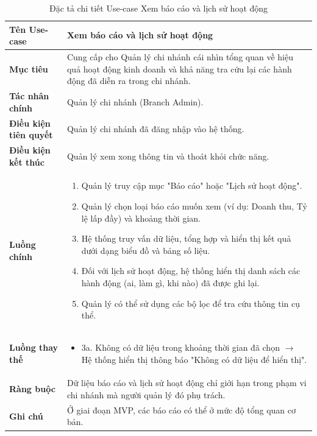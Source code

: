 \begin{table}[H]
\centering
\renewcommand{\arraystretch}{1.3}
\begin{tabular}{|p{4cm}|p{10cm}|}
\hline
\textbf{Tên Use-case} 
& Xem báo cáo và lịch sử hoạt động \\ 
\hline

\textbf{Mục tiêu} 
& Cung cấp cho Quản lý chi nhánh cái nhìn tổng quan về hiệu quả hoạt động kinh doanh và khả năng tra cứu lại các hành động đã diễn ra trong chi nhánh. \\ 
\hline

\textbf{Tác nhân chính} 
& Quản lý chi nhánh (Branch Admin). \\ 
\hline

\textbf{Điều kiện tiên quyết} 
& Quản lý chi nhánh đã đăng nhập vào hệ thống. \\ 
\hline

\textbf{Điều kiện kết thúc} 
& Quản lý xem xong thông tin và thoát khỏi chức năng. \\ 
\hline

\textbf{Luồng chính} 
& 
\begin{enumerate}
    \item Quản lý truy cập mục "Báo cáo" hoặc "Lịch sử hoạt động".
    \item Quản lý chọn loại báo cáo muốn xem (ví dụ: Doanh thu, Tỷ lệ lấp đầy) và khoảng thời gian.
    \item Hệ thống truy vấn dữ liệu, tổng hợp và hiển thị kết quả dưới dạng biểu đồ và bảng số liệu.
    \item Đối với lịch sử hoạt động, hệ thống hiển thị danh sách các hành động (ai, làm gì, khi nào) đã được ghi lại.
    \item Quản lý có thể sử dụng các bộ lọc để tra cứu thông tin cụ thể.
\end{enumerate} \\ 
\hline

\textbf{Luồng thay thế} 
& 
\begin{itemize}
    \item 3a. Không có dữ liệu trong khoảng thời gian đã chọn $\rightarrow$ Hệ thống hiển thị thông báo "Không có dữ liệu để hiển thị".
\end{itemize} \\ 
\hline

\textbf{Ràng buộc} 
& Dữ liệu báo cáo và lịch sử hoạt động chỉ giới hạn trong phạm vi chi nhánh mà người quản lý đó phụ trách. \\ 
\hline

\textbf{Ghi chú} 
& Ở giai đoạn MVP, các báo cáo có thể ở mức độ tổng quan cơ bản. \\ 
\hline
\end{tabular}
\caption{Đặc tả chi tiết Use-case Xem báo cáo và lịch sử hoạt động}
\label{tab:report-view-spec}
\end{table}

